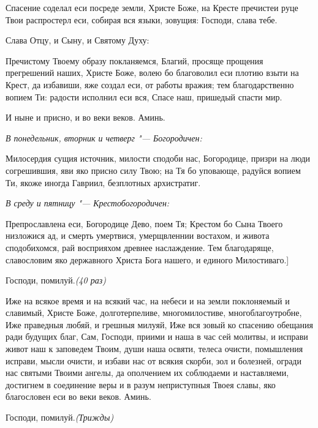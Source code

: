 Спасение соделал еси посреде земли, Христе Боже, на Кресте пречистеи руце Твои распростерл еси, собирая вся языки, зовущия: Господи, слава тебе.



Слава Отцу, и Сыну, и Святому Духу: 



Пречистому Твоему образу покланяемся, Благий, просяще прощения прегрешений наших, Христе Боже, волею бо благоволил еси плотию взыти на Крест, да избавиши, яже создал еси, от работы вражия; тем благодарственно вопием Ти: радости исполнил еси вся, Спасе наш, пришедый спасти мир.



И ныне и присно, и во веки веков. Аминь.

\itshape В понедельник, вторник и четверг "--- Богородичен:

\normalfont{}Милосердия сущия источник, милости сподоби нас, Богородице, призри на люди согрешившия, яви яко присно силу Твою; на Тя бо уповающе, радуйся вопием Ти, якоже иногда Гавриил, безплотных архистратиг.

\itshape В среду и пятницу "--- Крестобогородичен:

\normalfont{}Препрославлена еси, Богородице Дево, поем Тя; Крестом бо Сына Твоего низложися ад, и смерть умертвися, умерщвленнии востахом, и живота сподобихомся, рай восприяхом древнее наслаждение. Тем благодаряще, славословим яко державного Христа Бога нашего, и единого Милостиваго.]





Господи, помилуй.\itshape  (40 раз)



\normalfont{}Иже на всякое время и на всякий час, на небеси и на земли поклоняемый и славимый, Христе Боже, долготерпеливе, многомилостиве, многоблагоутробне, Иже праведныя любяй, и грешныя милуяй, Иже вся зовый ко спасению обещания ради будущих благ, Сам, Господи, приими и наша в час сей молитвы, и исправи живот наш к заповедем Твоим, души наша освяти, телеса очисти, помышления исправи, мысли очисти, и избави нас от всякия скорби, зол и болезней, огради нас святыми Твоими ангелы, да ополчением их соблюдаеми и наставляеми, достигнем в соединение веры и в разум неприступныя Твоея славы, яко благословен еси во веки веков. Аминь.





Господи, помилуй.\itshape  (Трижды)



